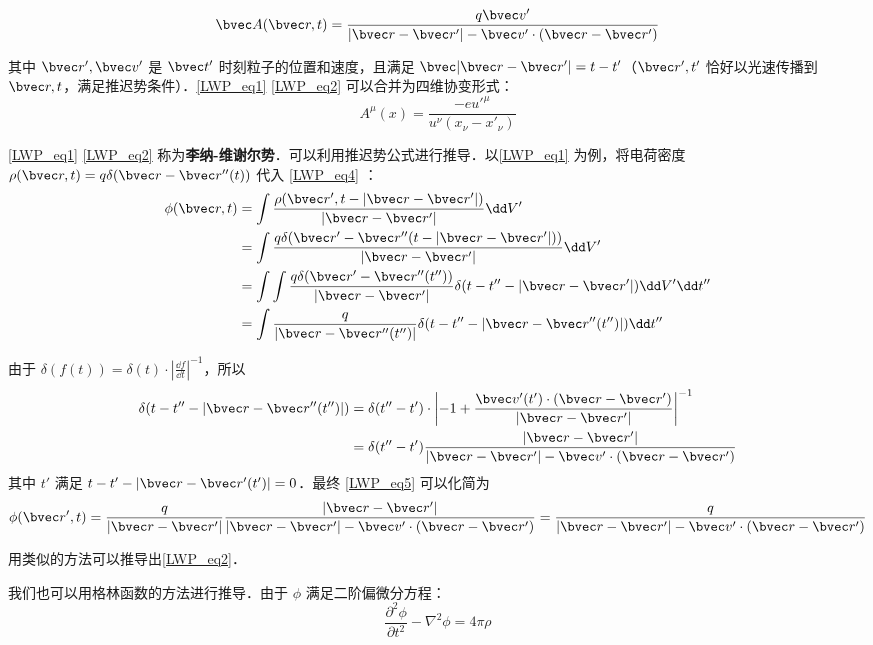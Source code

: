 \begin{equation}\label{LWP_eq2}
\bvec A(\bvec r,t)=\frac{q\bvec v'}{|\bvec r-\bvec r'|-\bvec v'\cdot (\bvec r-\bvec r')}
\end{equation}

其中 $\bvec r',\bvec v'$ 是 $\bvec t'$ 时刻粒子的位置和速度，且满足 $\bvec |\bvec r-\bvec r'|=t-t'$（$\bvec r',t'$ 恰好以光速传播到 $\bvec r,t$，满足推迟势条件）．\autoref{LWP_eq1} \autoref{LWP_eq2} 可以合并为四维协变形式：
\begin{equation}
A^\mu(x)=\frac{-e u'^\mu}{u^\nu (x_\nu-x'_\nu)}
\end{equation}

\autoref{LWP_eq1} \autoref{LWP_eq2} 称为\textbf{李纳-维谢尔势}．可以利用推迟势公式进行推导．以\autoref{LWP_eq1} 为例，将电荷密度 $\rho(\bvec r,t)=q\delta(\bvec r-\bvec r''(t))$ 代入 
\autoref{LWP_eq4} ：
\begin{equation}\label{LWP_eq5}
\begin{aligned}
\phi(\bvec r,t)&=\int \frac{\rho(\bvec r',t-|\bvec r-\bvec r'|)}{|\bvec r-\bvec r'|}\dd V'\\
&=\int \frac{q\delta(\bvec r'-\bvec r''(t-|\bvec r-\bvec r'|))}{|\bvec r-\bvec r'|}\dd V'\\
&=\int \int \frac{q\delta(\bvec r'-\bvec r''(t''))}{|\bvec r-\bvec r'|}\delta (t-t''-|\bvec r-\bvec r'|)\dd V'\dd t''\\
&=\int \frac{q}{|\bvec r-\bvec r''(t'')|}\delta (t-t''-|\bvec r-\bvec r''(t'')|)\dd t''
\end{aligned}\\
\end{equation}

由于 $\delta(f(t))=\delta(t)\cdot \left|\frac{\dd f}{\dd t}\right|^{-1}$，所以
\begin{equation}
\begin{aligned}
\delta (t-t''-|\bvec r-\bvec r''(t'')|)&=\delta(t''-t')\cdot \left|-1+\frac{\bvec v'(t')\cdot (\bvec r-\bvec r')}{|\bvec r-\bvec r'|}\right|^{-1}\\
&=\delta(t''-t')\frac{|\bvec r-\bvec r'|}{|\bvec r-\bvec r'|-\bvec v'\cdot (\bvec r-\bvec r')}
\end{aligned}
\end{equation}
其中 $t'$ 满足 $t-t'-|\bvec r-\bvec r'(t')|=0$．最终 \autoref{LWP_eq5} 可以化简为
\begin{equation}
\phi(\bvec r',t)=\frac{q}{|\bvec r-\bvec r'|}\frac{|\bvec r-\bvec r'|}{|\bvec r-\bvec r'|-\bvec v'\cdot (\bvec r-\bvec r')}=\frac{q}{|\bvec r-\bvec r'|-\bvec v'\cdot (\bvec r-\bvec r')}
\end{equation}

用类似的方法可以推导出\autoref{LWP_eq2}．

我们也可以用格林函数的方法进行推导．由于 $\phi$ 满足二阶偏微分方程：
\begin{equation}
\frac{\partial^2 \phi}{\partial t^2}-\nabla^2 \phi= 4\pi \rho
\end{equation}
